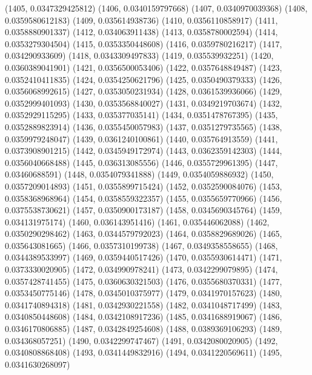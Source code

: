 {					(1405, 0.0347329425812)
					(1406, 0.0340159797668)
					(1407, 0.0340970039368)
					(1408, 0.0359580612183)
					(1409, 0.035614938736)
					(1410, 0.0356110858917)
					(1411, 0.0358880901337)
					(1412, 0.034063911438)
					(1413, 0.0358780002594)
					(1414, 0.0353279304504)
					(1415, 0.0353350448608)
					(1416, 0.0359780216217)
					(1417, 0.034290933609)
					(1418, 0.0343309497833)
					(1419, 0.035539932251)
					(1420, 0.0360389041901)
					(1421, 0.0356500053406)
					(1422, 0.0357648849487)
					(1423, 0.0352410411835)
					(1424, 0.0354250621796)
					(1425, 0.0350490379333)
					(1426, 0.0356068992615)
					(1427, 0.0353050231934)
					(1428, 0.0361539936066)
					(1429, 0.0352999401093)
					(1430, 0.0353568840027)
					(1431, 0.0349219703674)
					(1432, 0.0352929115295)
					(1433, 0.035377035141)
					(1434, 0.0351478767395)
					(1435, 0.0352889823914)
					(1436, 0.0355450057983)
					(1437, 0.0351279735565)
					(1438, 0.0359979248047)
					(1439, 0.0361240100861)
					(1440, 0.035764913559)
					(1441, 0.0373908901215)
					(1442, 0.0345949172974)
					(1443, 0.0362359142303)
					(1444, 0.0356040668488)
					(1445, 0.036313085556)
					(1446, 0.0355729961395)
					(1447, 0.03460688591)
					(1448, 0.0354079341888)
					(1449, 0.0354059886932)
					(1450, 0.0357209014893)
					(1451, 0.0355899715424)
					(1452, 0.0352590084076)
					(1453, 0.0358368968964)
					(1454, 0.0358559322357)
					(1455, 0.0355659770966)
					(1456, 0.0375538730621)
					(1457, 0.0350900173187)
					(1458, 0.0345690345764)
					(1459, 0.034131975174)
					(1460, 0.036143951416)
					(1461, 0.035446062088)
					(1462, 0.0350290298462)
					(1463, 0.0344579792023)
					(1464, 0.0358829689026)
					(1465, 0.035643081665)
					(1466, 0.0357310199738)
					(1467, 0.0349358558655)
					(1468, 0.0344389533997)
					(1469, 0.0359440517426)
					(1470, 0.0355930614471)
					(1471, 0.0373330020905)
					(1472, 0.034990978241)
					(1473, 0.0342299079895)
					(1474, 0.0357428741455)
					(1475, 0.0360630321503)
					(1476, 0.0355680370331)
					(1477, 0.0353450775146)
					(1478, 0.0345010375977)
					(1479, 0.0341970157623)
					(1480, 0.0341740894318)
					(1481, 0.0342930221558)
					(1482, 0.0341048717499)
					(1483, 0.0340850448608)
					(1484, 0.0342108917236)
					(1485, 0.0341688919067)
					(1486, 0.0346170806885)
					(1487, 0.0342849254608)
					(1488, 0.0389369106293)
					(1489, 0.034368057251)
					(1490, 0.0342299747467)
					(1491, 0.0342080020905)
					(1492, 0.0340808868408)
					(1493, 0.0341449832916)
					(1494, 0.0341220569611)
					(1495, 0.0341630268097)
}
